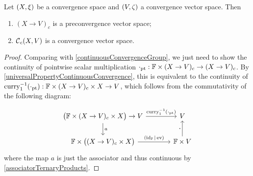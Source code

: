 \begin{proposition} \label{continuousConvergenceVectorSpace}
Let $\left( X,\xi \right)$ be a convergence space and $\left( V, \zeta \right)$ a convergence vector space. Then
\begin{enumerate}
\item $(X\to V)_c$ is a preconvergence vector space;
\item $\operatorname{\mathcal{C}}_c(X,V)$ is a convergence vector space.
\end{enumerate}
\end{proposition}
\begin{proof}
Comparing with \ref{continuousConvergenceGroup}, we just need to show the continuity of pointwise scalar multiplication $\cdot_\text{pt}: \mathbb{F}\times (X\to V)_c \to (X\to V)_c$. By \ref{universalPropertyContinuousConvergence}, this is equivalent to the continuity of $\operatorname{curry}_1^{-1}(\cdot_\text{pt}): \mathbb{F}\times (X\to V)_c\times X \to V$, which follows from the commutativity of the following diagram:

\[ \begin{tikzcd}[column sep=large]
\big(\F\times (X\to V)_c\times X\big) \to V \arrow[r, "{\curry_1^{-1}(\cdot_\text{pt})}"] \arrow[d, "a"] & V \\
\F\times \big((X\to V)_c\times X\big) \arrow[r, "(\id_\F|\evalMap)"] & \F\times V \arrow[u, "{\boldsymbol{\cdot}}"]
\end{tikzcd} \]
where the map $a$ is just the associator and thus continuous by  \ref{associatorTernaryProducts}.
\end{proof}


